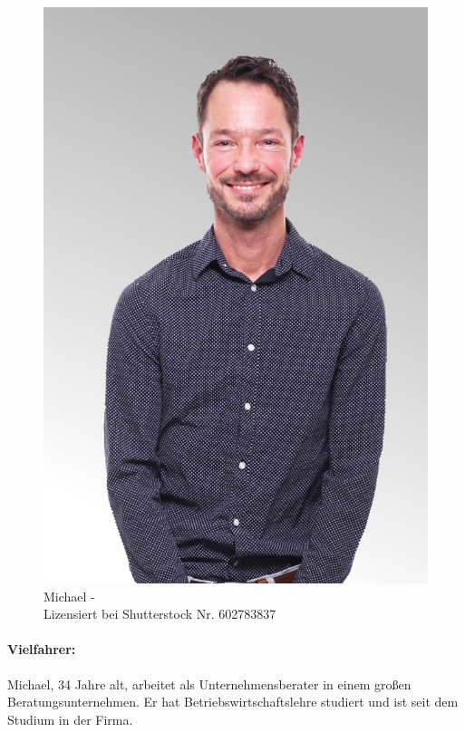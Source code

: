 \begin{figure}
    \vspace{-\intextsep}
    \centering
    \includegraphics[width=\textwidth]{contents/06_model_evaluation/01_integration/res/persona_picture_michael.png}
    \caption[]{Michael -\\Lizensiert bei Shutterstock Nr. 602783837}
\end{figure}

\paragraph{Vielfahrer:} Michael, 34 Jahre alt, arbeitet als Unternehmensberater in einem großen Beratungsunternehmen. Er hat Betriebswirtschaftslehre studiert und ist seit dem Studium in der Firma.

